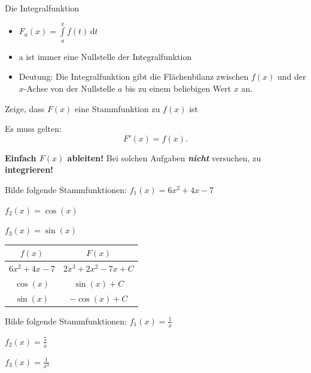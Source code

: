 \documentclass[paper=a6,ngerman,twoside=true,fontsize=14pt, parskip = half]{scrartcl}
\begin{document}
\begin{frage}
	Die Integralfunktion
\end{frage}
\begin{antwort}
	\begin{itemize}
		\item $F_a(x)=\displaystyle\int\limits_{a}^{x} \! f(t) \, \mathrm{d}t$
		\item a ist immer eine Nullstelle der Integralfunktion
		\item Deutung: Die Integralfunktion gibt die Flächenbilanz zwischen $f(x)$ und der $x$-Achse von der Nullstelle $a$ bis zu einem beliebigen Wert $x$ an.		
	\end{itemize}
\end{antwort}
\begin{frage}
	Zeige, dass $F(x)$ eine Stammfunktion zu $f(x)$ ist
\end{frage}
\begin{antwort}
	Es muss gelten: \[F'(x)=f(x).\]


	\begin{marked}
		\textbf{Einfach $F(x)$ ableiten!} 
		Bei solchen Aufgaben \textbf{\emph{nicht}} versuchen, 
		zu \textbf{integrieren!}
	\end{marked}
\end{antwort}
\begin{frage}
	Bilde folgende Stammfunktionen: 
	\flushleft 
	$f_1(x)=6x^2+4x-7$
	
	\bigskip
   	$f_2(x)=\cos(x)$
   	
   	\bigskip
	$f_3(x)=\sin(x)$	
\end{frage}
\begin{antwort}
\begin{center}
	\renewcommand{\arraystretch}{1.4} %
	\begin{tabular}{c|c}
	$f(x)$ & $F(x)$ \\
	\hline
	$6x^2 + 4x - 7$ & $2x^3 + 2x^2 - 7x + C$ \\
	$\cos(x)$ & $\sin(x) + C$ \\
	$\sin(x)$ & $-\cos(x) + C$ \\
	\end{tabular}
\end{center}
\end{antwort}
\begin{frage}
	Bilde folgende Stammfunktionen: 
	\flushleft 
	$f_1(x)=\frac{1}{x}$
	
	\bigskip
	$f_2(x)=\frac{5}{x}$
	
	\bigskip
	$f_3(x)=\frac{1}{x^3}$	
\end{frage}
\end{document}
